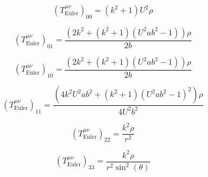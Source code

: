 $$\left(T_{\mathrm{Euler}}^{\mu\nu}\right)_{00} = \left(k^{2} + 1\right) U^{2} \rho$$

$$\left(T_{\mathrm{Euler}}^{\mu\nu}\right)_{01} = \frac{\left(2 k^{2} + \left(k^{2} + 1\right) \left(U^{2} a b^{2} - 1\right)\right) \rho}{2 b}$$

$$\left(T_{\mathrm{Euler}}^{\mu\nu}\right)_{10} = \frac{\left(2 k^{2} + \left(k^{2} + 1\right) \left(U^{2} a b^{2} - 1\right)\right) \rho}{2 b}$$

$$\left(T_{\mathrm{Euler}}^{\mu\nu}\right)_{11} = \frac{\left(4 k^{2} U^{2} a b^{2} + \left(k^{2} + 1\right) \left(U^{2} a b^{2} - 1\right)^{2}\right) \rho}{4 U^{2} b^{2}}$$

$$\left(T_{\mathrm{Euler}}^{\mu\nu}\right)_{22} = \frac{k^{2} \rho}{r^{2}}$$

$$\left(T_{\mathrm{Euler}}^{\mu\nu}\right)_{33} = \frac{k^{2} \rho}{r^{2} \sin^{2}{\left(\theta \right)}}$$

